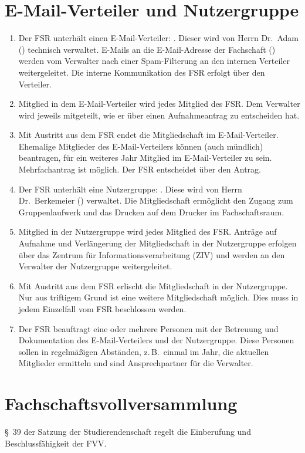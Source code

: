 \section{E-Mail-Verteiler und Nutzergruppe}
\begin{enumerate}
	\item Der FSR unterhält einen E-Mail-Verteiler: . Dieser wird von Herrn Dr.\ Adam () technisch verwaltet. E-Mails an die E-Mail-Adresse der Fachschaft () werden vom Verwalter nach einer Spam-Filterung an den internen Verteiler weitergeleitet. Die interne Kommunikation des FSR erfolgt über den Verteiler.
	\item Mitglied in dem E-Mail-Verteiler wird jedes Mitglied des FSR. Dem Verwalter wird jeweils mitgeteilt, wie er über einen Aufnahmeantrag zu entscheiden hat.
	\item Mit Austritt aus dem FSR endet die Mitgliedschaft im E-Mail-Verteiler. Ehemalige Mitglieder des E-Mail-Verteilers können (auch mündlich) beantragen, für ein weiteres Jahr Mitglied im E-Mail-Verteiler zu sein. Mehrfachantrag ist möglich. Der FSR entscheidet über den Antrag.
	\item Der FSR unterhält eine Nutzergruppe: . Diese wird von Herrn Dr.\ Berkemeier () verwaltet. Die Mitgliedschaft ermöglicht den Zugang zum Gruppenlaufwerk und das Drucken auf dem Drucker im Fachschaftsraum.
	\item Mitglied in der Nutzergruppe wird jedes Mitglied des FSR. Anträge auf Aufnahme und Verlängerung der Mitgliedschaft in der Nutzergruppe erfolgen über das Zentrum für Informationsverarbeitung (ZIV) und werden an den Verwalter der Nutzergruppe weitergeleitet.
	\item Mit Austritt aus dem FSR erlischt die Mitgliedschaft in der Nutzergruppe. Nur aus triftigem Grund ist eine weitere Mitgliedschaft möglich. Dies muss in jedem Einzelfall vom FSR beschlossen werden.
	\item Der FSR beauftragt eine oder mehrere Personen mit der Betreuung und Dokumentation des E-Mail-Verteilers und der Nutzergruppe. Diese Personen sollen in regelmäßigen Abständen, z.\,B.\ einmal im Jahr, die aktuellen Mitglieder ermitteln und sind Ansprechpartner für die Verwalter.
\end{enumerate}

\section{Fachschaftsvollversammlung}
§~39 der Satzung der Studierendenschaft regelt die Einberufung und Beschlussfähigkeit der FVV.

